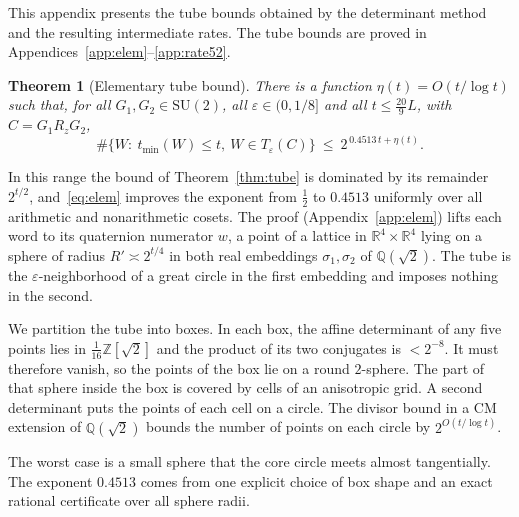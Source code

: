 \documentclass[aps,prx,twocolumn,superscriptaddress,nofootinbib,longbibliography]{revtex4-2}
\theoremstyle{plain}
\newtheorem{theorem}{Theorem}
\theoremstyle{definition}
\theoremstyle{remark}
\newcommand{\Z}{\mathbb{Z}}
\newcommand{\Q}{\mathbb{Q}}
\newcommand{\R}{\mathbb{R}}
\newcommand{\SU}{\mathrm{SU}(2)}
\begin{document}
This appendix presents the tube bounds obtained by the determinant method and the resulting intermediate rates. The tube bounds are proved in Appendices~\ref{app:elem}--\ref{app:rate52}.

\begin{theorem}[Elementary tube bound]\label{thm:elem}
There is a function $\eta(t)=O(t/\log t)$ such that, for all $G_1,G_2\in\SU$, all $\varepsilon\in(0,1/8]$ and all $t\le\tfrac{20}9L$, with $C=G_1R_zG_2$,
\begin{equation}\label{eq:elem}
\#\{W:\ t_{\min}(W)\le t,\ W\in T_\varepsilon(C)\}\ \le\ 2^{\,0.4513\,t+\eta(t)} .
\end{equation}
\end{theorem}
In this range the bound of Theorem~\ref{thm:tube} is dominated by its remainder $2^{t/2}$, and~\eqref{eq:elem} improves the exponent from $\tfrac12$ to $0.4513$ uniformly over all arithmetic and nonarithmetic cosets. The proof (Appendix~\ref{app:elem}) lifts each word to its quaternion numerator $w$, a point of a lattice in $\R^4\times\R^4$ lying on a sphere of radius $R'\asymp2^{t/4}$ in both real embeddings $\sigma_1,\sigma_2$ of $\Q(\sqrt2)$. The tube is the $\varepsilon$-neighborhood of a great circle in the first embedding and imposes nothing in the second. 

We partition the tube into boxes. In each box, the affine determinant of any five points lies in $\tfrac1{16}\Z[\sqrt2]$ and the product of its two conjugates is $<2^{-8}$. It must therefore vanish, so the points of the box lie on a round $2$-sphere. The part of that sphere inside the box is covered by cells of an anisotropic grid. A second determinant puts the points of each cell on a circle. The divisor bound in a CM extension of $\Q(\sqrt2)$ bounds the number of points on each circle by $2^{O(t/\log t)}$. 

The worst case is a small sphere that the core circle meets almost tangentially. The exponent $0.4513$ comes from one explicit choice of box shape and an exact rational certificate over all sphere radii.
\end{document}
